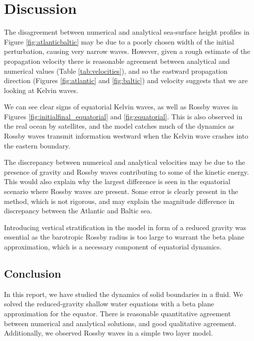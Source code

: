\section{Discussion}
\label{sec:conclusion}

The disagreement between numerical and analytical sea-surface height profiles in Figure \ref{fig:atlanticbaltic} may be due to a poorly chosen width of the initial perturbation, causing very narrow waves. However, given a rough estimate of the propagation velocity there is reasonable agreement between analytical and numerical values (Table \ref{tab:velocities}), and so the eastward propagation direction (Figures \ref{fig:atlantic} and \ref{fig:baltic}) and velocity suggests that we are looking at Kelvin waves.

We can see clear signs of equatorial Kelvin waves, as well as Rossby waves in Figures \ref{fig:initialfinal_equatorial} and \ref{fig:equatorial}. This is also observed in the real ocean by satellites, and the model catches much of the dynamics as Rossby waves transmit information westward when the Kelvin wave crashes into the eastern boundary. 

The discrepancy between numerical and analytical velocities may be due to the presence of gravity and Rossby waves contributing to some of the kinetic energy. This would also explain why the largest difference is seen in the equatorial scenario where Rossby waves are present. Some error is clearly present in the method, which is not rigorous, and may explain the magnitude difference in discrepancy between the Atlantic and Baltic sea.

Introducing vertical stratification in the model in form of a reduced gravity was essential as the barotropic Rossby radius is too large to warrant the beta plane approximation, which is a necessary component of equatorial dynamics.


\subsection{Conclusion}
In this report, we have studied the dynamics of solid boundaries in a fluid. We solved the reduced-gravity shallow water equations with a beta plane approximation for the equator. There is reasonable quantitative agreement between numerical and analytical solutions, and good qualitative agreement. Additionally, we observed Rossby waves in a simple two layer model.